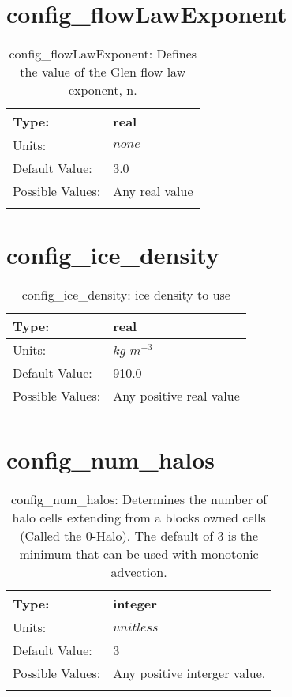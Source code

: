 \section[config\_flowLawExponent]{config\_flowLawExponent}
\label{sec:nm_sec_config_flowLawExponent}
\begin{center}
\begin{longtable}{| p{2.0in} || p{4.0in} |}
    \hline
    Type: & real \\
    \hline
    Units: & $none$ \\
    \hline
    Default Value: & 3.0 \\
    \hline
    Possible Values: & Any real value \\
    \hline
    \caption{config\_flowLawExponent: Defines the value of the Glen flow law exponent, n.}
\end{longtable}
\end{center}
\section[config\_ice\_density]{config\_ice\_density}
\label{sec:nm_sec_config_ice_density}
\begin{center}
\begin{longtable}{| p{2.0in} || p{4.0in} |}
    \hline
    Type: & real \\
    \hline
    Units: & $kg$ $m^{-3}$ \\
    \hline
    Default Value: & 910.0 \\
    \hline
    Possible Values: & Any positive real value \\
    \hline
    \caption{config\_ice\_density: ice density to use}
\end{longtable}
\end{center}
\section[config\_num\_halos]{config\_num\_halos}
\label{sec:nm_sec_config_num_halos}
\begin{center}
\begin{longtable}{| p{2.0in} || p{4.0in} |}
    \hline
    Type: & integer \\
    \hline
    Units: & $unitless$ \\
    \hline
    Default Value: & 3 \\
    \hline
    Possible Values: & Any positive interger value. \\
    \hline
    \caption{config\_num\_halos: Determines the number of halo cells extending from a blocks owned cells (Called the 0-Halo). The default of 3 is the minimum that can be used with monotonic advection.}
\end{longtable}
\end{center}

